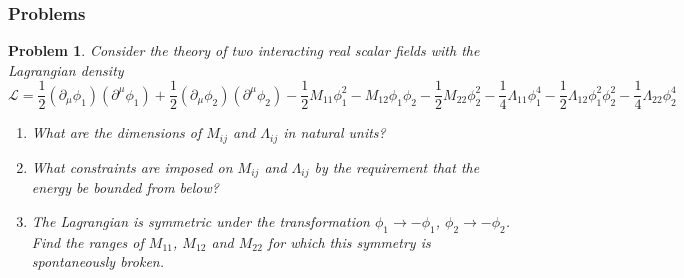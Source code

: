 \documentclass[a4paper]{article}
\theoremstyle{new}
\newtheorem{qns}{Problem}[section]
\begin{document}
\subsubsection{Problems}
\begin{qns}
Consider the theory of two interacting real scalar fields with the Lagrangian density
$$\mathcal{L}=\frac{1}{2}(\partial_\mu\phi_1)(\partial^\mu\phi_1)+\frac{1}{2}(\partial_\mu\phi_2)(\partial^\mu\phi_2)-\frac{1}{2}M_{11}\phi_1^2-M_{12}\phi_1\phi_2-\frac{1}{2}M_{22}\phi_2^2-\frac{1}{4}\Lambda_{11}\phi_1^4-\frac{1}{2}\Lambda_{12}\phi_1^2\phi_2^2-\frac{1}{4}\Lambda_{22}\phi_2^4$$
\begin{enumerate}[label=(\alph*)]
\item What are the dimensions of $M_{ij}$ and $\Lambda_{ij}$ in natural units?
\item What constraints are imposed on $M_{ij}$ and $\Lambda_{ij}$ by the requirement that the energy be bounded from below?
\item The Lagrangian is symmetric under the transformation $\phi_1\rightarrow-\phi_1$, $\phi_2\rightarrow-\phi_2$. Find the ranges of $M_{11}$, $M_{12}$ and $M_{22}$ for which this symmetry is spontaneously broken.
\end{enumerate}
\end{qns}
\end{document}
